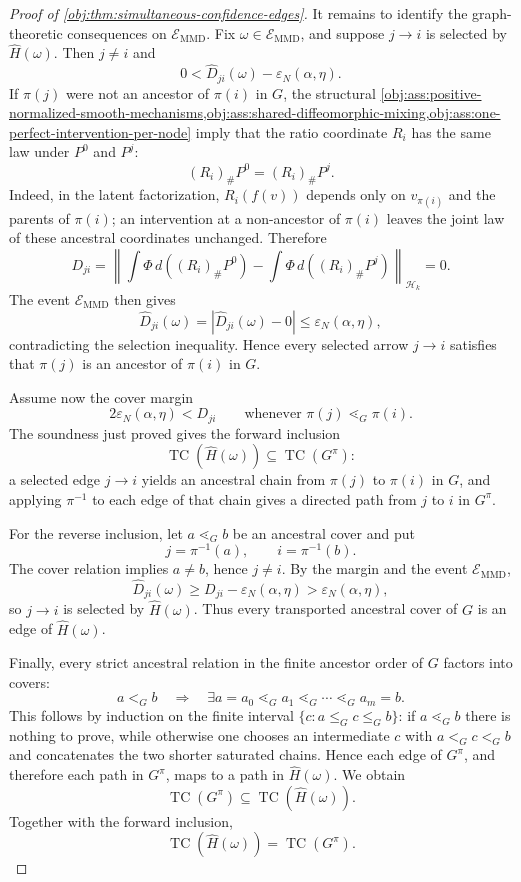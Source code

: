 \documentclass[11pt]{article}
\begin{document}
\begin{proof}[Proof of \cref{obj:thm:simultaneous-confidence-edges}]
It remains to identify the graph-theoretic consequences on \(\mathcal E_{\mathrm{MMD}}\).  Fix \(\omega\in\mathcal E_{\mathrm{MMD}}\), and suppose \(j\to i\) is selected by \(\widehat H(\omega)\).  Then \(j\ne i\) and
\[
0<\widehat D_{ji}(\omega)-\varepsilon_N(\alpha,\eta).
\]
If \(\pi(j)\) were not an ancestor of \(\pi(i)\) in \(G\), the structural \cref{obj:ass:positive-normalized-smooth-mechanisms,obj:ass:shared-diffeomorphic-mixing,obj:ass:one-perfect-intervention-per-node} imply that the ratio coordinate \(R_i\) has the same law under \(P^0\) and \(P^j\):
\[
(R_i)_\#P^0=(R_i)_\#P^j.
\]
Indeed, in the latent factorization, \(R_i(f(v))\) depends only on \(v_{\pi(i)}\) and the parents of \(\pi(i)\); an intervention at a non-ancestor of \(\pi(i)\) leaves the joint law of these ancestral coordinates unchanged.  Therefore
\[
D_{ji}
=
\left\|
\int\Phi\,d((R_i)_\#P^0)
-
\int\Phi\,d((R_i)_\#P^j)
\right\|_{\mathcal H_k}
=0.
\]
The event \(\mathcal E_{\mathrm{MMD}}\) then gives
\[
\widehat D_{ji}(\omega)
=
|\widehat D_{ji}(\omega)-0|
\le
\varepsilon_N(\alpha,\eta),
\]
contradicting the selection inequality.  Hence every selected arrow \(j\to i\) satisfies that \(\pi(j)\) is an ancestor of \(\pi(i)\) in \(G\).

Assume now the cover margin
\[
2\varepsilon_N(\alpha,\eta)<D_{ji}
\qquad
\text{whenever }\pi(j)\lessdot_G\pi(i).
\]
The soundness just proved gives the forward inclusion
\[
\operatorname{TC}(\widehat H(\omega))
\subseteq
\operatorname{TC}(G^\pi):
\]
a selected edge \(j\to i\) yields an ancestral chain from \(\pi(j)\) to \(\pi(i)\) in \(G\), and applying \(\pi^{-1}\) to each edge of that chain gives a directed path from \(j\) to \(i\) in \(G^\pi\).

For the reverse inclusion, let \(a\lessdot_G b\) be an ancestral cover and put
\[
j=\pi^{-1}(a),
\qquad
i=\pi^{-1}(b).
\]
The cover relation implies \(a\ne b\), hence \(j\ne i\).  By the margin and the event \(\mathcal E_{\mathrm{MMD}}\),
\[
\widehat D_{ji}(\omega)
\ge
D_{ji}-\varepsilon_N(\alpha,\eta)
>
\varepsilon_N(\alpha,\eta),
\]
so \(j\to i\) is selected by \(\widehat H(\omega)\).  Thus every transported ancestral cover of \(G\) is an edge of \(\widehat H(\omega)\).

Finally, every strict ancestral relation in the finite ancestor order of \(G\) factors into covers:
\[
a<_G b
\quad\Longrightarrow\quad
\exists a=a_0\lessdot_G a_1\lessdot_G\cdots\lessdot_G a_m=b.
\]
This follows by induction on the finite interval
\(\{c:a\le_G c\le_G b\}\): if \(a\lessdot_G b\) there is nothing to prove, while otherwise one chooses an intermediate \(c\) with \(a<_G c<_G b\) and concatenates the two shorter saturated chains.  Hence each edge of \(G^\pi\), and therefore each path in \(G^\pi\), maps to a path in \(\widehat H(\omega)\).  We obtain
\[
\operatorname{TC}(G^\pi)
\subseteq
\operatorname{TC}(\widehat H(\omega)).
\]
Together with the forward inclusion,
\[
\operatorname{TC}(\widehat H(\omega))
=
\operatorname{TC}(G^\pi).
\]
\end{proof}




\end{document}
